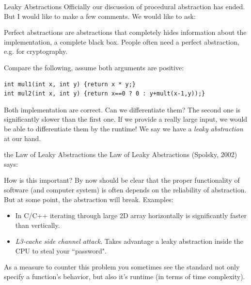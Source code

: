 \begin{frame}[fragile]{Leaky Abstractions}
Officially our discussion of procedural abstraction has ended. But I would like to make a few comments. We would like to ask:
\begin{center}
\end{center}
Perfect abstractions are abstractions that completely hides information about the implementation, a complete black box. People often need a perfect abstraction, e.g. for cryptography.

Compare the following, assume both arguments are positive:
\begin{verbatim}
int mul1(int x, int y) {return x * y;}
int mul2(int x, int y) {return x==0 ? 0 : y+mult(x-1,y));}
\end{verbatim}
Both implementation are correct. Can we differentiate them? The second one is significantly slower than the first one. If we provide a really large input, we would be able to differentiate them by the runtime! We say we have a \textit{leaky abstraction} at our hand.
\end{frame}

\begin{frame}[fragile]{the Law of Leaky Abstractions}
the Law of Leaky Abstractions (Spolsky, 2002) says:
\begin{quotation}
\end{quotation}
How is this important? By now should be clear that the proper functionality of software (and computer system) is often depends on the reliability of abstraction. But at some point, the abstraction will break. Examples:
\begin{itemize}
	\item In C/C++ iterating through large 2D array horizontally is significantly faster than vertically.
	\item \textit{L3-cache side channel attack}. Takes advantage a leaky abstraction inside the CPU to steal your ``password".
\end{itemize}
As a measure to counter this problem you sometimes see the standard not only specify a function's behavior, but also it's runtime (in terms of time complexity).
\end{frame}

